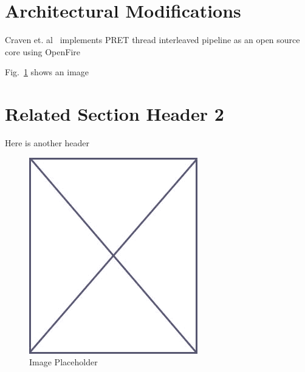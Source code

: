 
\section{Architectural Modifications}
\label{sec:related_arch_mod}

Craven et. al~\cite{Craven_PRET_implementation_2010} implements PRET thread interleaved pipeline as an open source core using OpenFire 

Fig.~\ref{fig:placeholder_related} shows an image

\section{Related Section Header 2}
\label{sec:related_sec_2}

Here is another header

\begin{figure}
\begin{center}
\vspace{-32pt}
\includegraphics[scale=.45]{figs/placeholder}
\end{center}
\vspace{-12pt}
\caption{Image Placeholder}
\label{fig:placeholder_related}
\end{figure}
